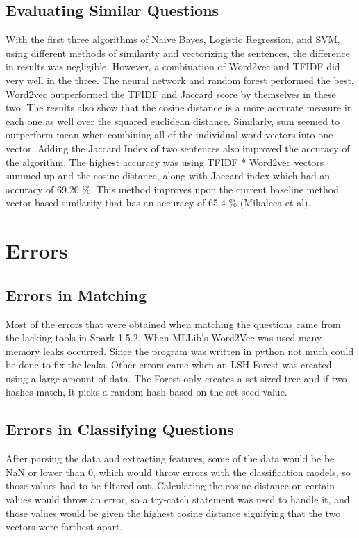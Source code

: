 \documentclass[9pt,twocolumn,twoside]{idsi}
\begin{document}
\subsection{Evaluating Similar Questions}
With the first three algorithms of Naive Bayes, Logistic Regression, and SVM, using different methods of similarity and vectorizing the sentences, the difference in results was negligible. However, a combination of Word2vec and TFIDF did very well in the three. The neural network and random forest performed the best. Word2vec outperformed the TFIDF and Jaccard score by themselves in these two. The results also show that the cosine distance is a more accurate measure in each one as well over the squared euclidean distance. Similarly, sum seemed to outperform mean when combining all of the individual word vectors into one vector. Adding the Jaccard Index of two sentences also improved the accuracy of the algorithm.
The highest accuracy was using TFIDF * Word2vec vectors summed up and the cosine distance, along with Jaccard index which had an accuracy of 69.20 \%. This method improves upon the current baseline method vector based similarity that has an accuracy of 65.4 \% (Mihalcea et al).\\ 

\section{Errors}
\subsection{Errors in Matching}
Most of the errors that were obtained when matching the questions came from the lacking tools in Spark 1.5.2. When MLLib's Word2Vec was used many memory leaks occurred. Since the program was written in python not much could be done to fix the leaks. Other errors came when an LSH Forest was created using a large amount of data. The Forest only creates a set sized tree and if two hashes match, it picks a random hash based on the set seed value.

\subsection{Errors in Classifying Questions}
After parsing the data and extracting features, some of the data would be be NaN or lower than 0, which would throw errors with the classification models, so those values had to be filtered out. Calculating the cosine distance on certain values would throw an error, so a try-catch statement was used to handle it, and those values would be given the highest cosine distance signifying that the two vectors were farthest apart.
\end{document}
